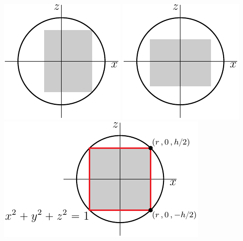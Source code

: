 \begin{solution}
\begin{center}
     \includegraphics{fig/OE06A_4r.pdf}\quad
     \includegraphics{fig/OE06A_4h.pdf}
     \includegraphics{fig/OE06A_4.pdf}
\end{center}


\end{solution}
